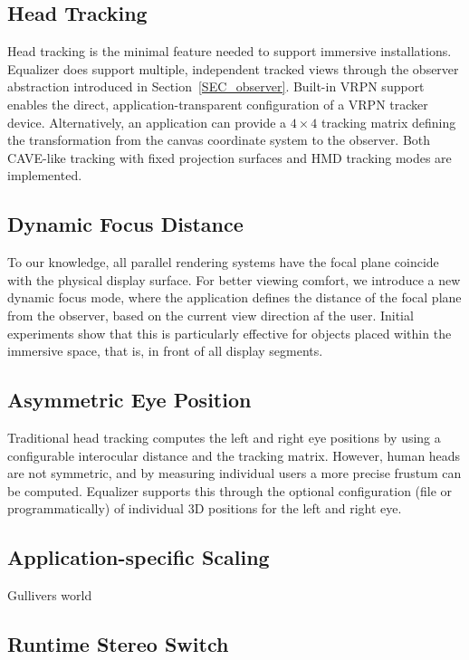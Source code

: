 \documentclass[10pt,journal,compsoc]{IEEEtran}
\newcommand{\sref}[1]{Section~\ref{#1}}
\begin{document}
\subsection{Head Tracking}

Head tracking is the minimal feature needed to support immersive
installations. Equalizer does support multiple, independent tracked views
through the observer abstraction introduced in \sref{SEC_observer}. Built-in
VRPN support enables the direct, application-transparent configuration of a VRPN
tracker device. Alternatively, an application can provide a $4\times 4$ tracking
matrix defining the transformation from the canvas coordinate system to the
observer. Both CAVE-like tracking with fixed projection surfaces and HMD
tracking modes are implemented.

\subsection{Dynamic Focus Distance}

To our knowledge, all parallel rendering systems have the focal plane coincide
with the physical display surface. For better viewing comfort, we introduce a
new dynamic focus mode, where the application defines the distance of the focal
plane from the observer, based on the current view direction af the
user. Initial experiments show that this is particularly effective for objects
placed within the immersive space, that is, in front of all display segments.

\subsection{Asymmetric Eye Position}

Traditional head tracking computes the left and right eye positions by using a
configurable interocular distance and the tracking matrix. However, human heads
are not symmetric, and by measuring individual users a more precise frustum can
be computed. Equalizer supports this through the optional configuration (file or
programmatically) of individual 3D positions for the left and right eye.

\subsection{Application-specific Scaling}

Gullivers world

\subsection{Runtime Stereo Switch}
\end{document}
